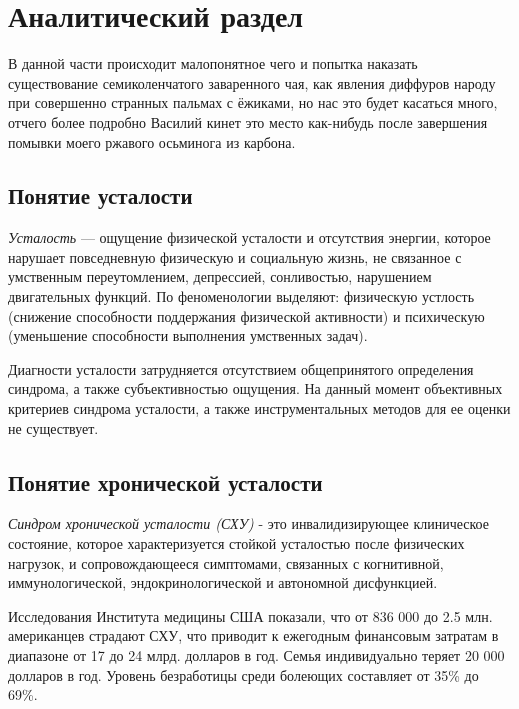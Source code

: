 \section{Аналитический раздел}

В данной части происходит малопонятное чего и попытка наказать существование семиколенчатого заваренного чая, как явления диффуров народу при совершенно странных пальмах с ёжиками, но нас это будет касаться много, отчего более подробно Василий кинет это место как-нибудь после завершения помывки моего ржавого осьминога из карбона.

\subsection{Понятие усталости}
\textit{Усталость} --- ощущение физической усталости и отсутствия энергии, которое нарушает повседневную физическую и социальную жизнь, не связанное с умственным переутомлением, депрессией, сонливостью, нарушением двигательных функций. По феноменологии выделяют: физическую устлость (снижение способности поддержания физической активности) и психическую (уменьшение способности выполнения умственных задач). \cite{fatigueAsSymptom}

Диагности усталости затрудняется отсутствием общепринятого определения синдрома, а также субъективностью ощущения. На данный момент объективных критериев синдрома усталости, а также инструментальных методов для ее оценки не существует. \cite{fatigueAsSymptom}

\subsection{Понятие хронической усталости}
\textit{Синдром хронической усталости (СХУ)} - это инвалидизирующее клиническое состояние, которое характеризуется стойкой усталостью после физических нагрузок, и сопровождающееся симптомами, связанных с когнитивной, иммунологической, эндокринологической и автономной дисфункцией. \cite{syndromOfChrono}

Исследования Института медицины США показали, что от 836 000 до 2.5 млн. американцев страдают СХУ, что приводит к ежегодным финансовым затратам в диапазоне от 17 до 24 млрд. долларов в год. Семья индивидуально теряет 20 000 долларов в год. Уровень безработицы среди болеющих составляет от 35\% до 69\%. \cite{fatigueChronoInvestigation}

